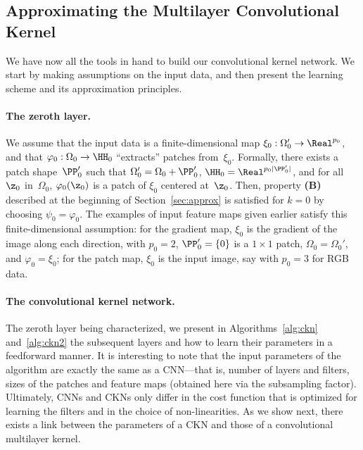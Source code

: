 \vspace*{-0.3cm}
\subsection{Approximating the Multilayer Convolutional Kernel}

We have now all the tools in hand to build our convolutional kernel network.
We start by making assumptions on the input data, and then present the learning scheme and its approximation principles.

\vs
\paragraph{The zeroth layer.} We assume that the input data is a
finite-dimensional map $\xi_0: \Omega_0' \to \Real^{p_0}$, and that $\varphi_0:
\Omega_0 \to \HH_0$ ``extracts'' patches from~$\xi_0$. Formally, there
exists a patch shape~$\PP_0'$ such that $\Omega_0' = \Omega_0 + \PP_0'$, $\HH_0
= \Real^{p_0|\PP_0'|}$, and for all $\z_0$ in~$\Omega_0$, $\varphi_0(\z_0)$ is
a patch of $\xi_0$ centered at~$\z_0$. 
Then, property {\bfseries (B)} described at the beginning of
Section~\ref{sec:approx} is satisfied for $k\!=\!0$ by choosing
$\psi_0\!=\!\varphi_0$. The examples of input feature maps given earlier
satisfy this finite-dimensional assumption: for the gradient map, $\xi_0$ is
the gradient of the image along each direction, with $p_0=2$, $\PP_0'=\{ 0\}$
is
a $1 \!\times \!1$ patch, $\Omega_0\!=\!\Omega_0'$, and $\varphi_0\!=\!\xi_0$;
for the patch map, $\xi_0$ is the input image, say with $p_0\!=\!3$ for RGB data.


\vs
\paragraph{The convolutional kernel network.}
The zeroth layer being characterized, we present in Algorithms~\ref{alg:ckn}
and~\ref{alg:ckn2} the subsequent layers and how to learn their parameters 
in a feedforward manner. It is interesting to note that the input parameters of
the algorithm are exactly the same as a CNN---that is, number of layers and filters,
sizes of the patches and feature maps (obtained here via the subsampling factor).
Ultimately, CNNs and CKNs only differ in the cost function that is
optimized for learning the filters and in the choice of non-linearities.  As we
show next, there exists a link between the parameters of a CKN and those of
a convolutional multilayer kernel.

